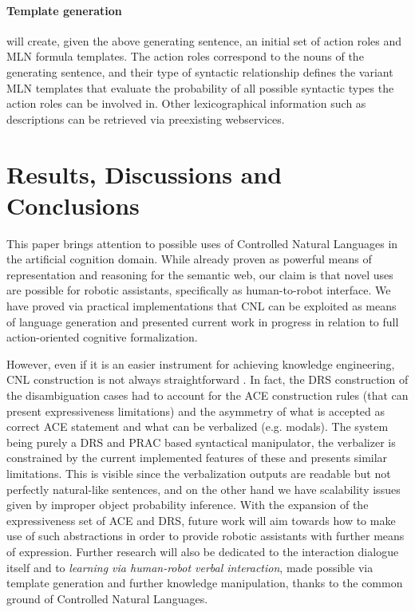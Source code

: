 \documentclass[oribibl]{llncs}
\begin{document}
\paragraph{Template generation} will create, given the above generating 
sentence, an initial set of action roles and MLN formula templates.  
The action roles correspond to the nouns of the generating sentence, 
and their type of syntactic relationship defines the variant MLN 
templates that evaluate the probability of all possible syntactic 
types the action roles can be involved in. Other lexicographical 
information such as descriptions can be retrieved via preexisting 
webservices.

\section{Results, Discussions and Conclusions}
This paper brings attention to possible uses of Controlled Natural 
Languages in the artificial cognition domain. While already proven 
as powerful means of representation and reasoning for the semantic 
web\cite{kaljurand:phd}, our claim is that novel uses are possible 
for robotic assistants, specifically as human-to-robot interface.
We have proved via practical implementations that CNL can be exploited
 as means of language generation and presented current work in progress
  in relation to full action-oriented cognitive formalization.

However, even if it is an easier instrument for achieving knowledge 
engineering, CNL construction is not always straightforward
\cite{Schwitter05alayered}. In fact, the DRS construction of the 
disambiguation cases had to account for the ACE construction rules 
(that can present expressiveness limitations) and the asymmetry of 
what is accepted as correct ACE statement and what can be verbalized 
(e.g. modals). The system being purely a DRS and PRAC based syntactical 
manipulator, the verbalizer is constrained by the current implemented 
features of these and presents similar limitations. This is visible since 
the verbalization outputs are readable but not perfectly natural-like 
sentences, and on the other hand we have scalability issues given by improper object probability inference.
With the expansion of the expressiveness set of ACE and DRS, future work will aim towards how to make use of such abstractions in order to provide robotic assistants with further means of expression.
Further research will also be dedicated to the interaction dialogue itself and to \textit{learning via human-robot verbal interaction}, made possible via template generation and further knowledge manipulation, thanks to the common ground of Controlled Natural Languages.

%
{}

%
\end{document}
